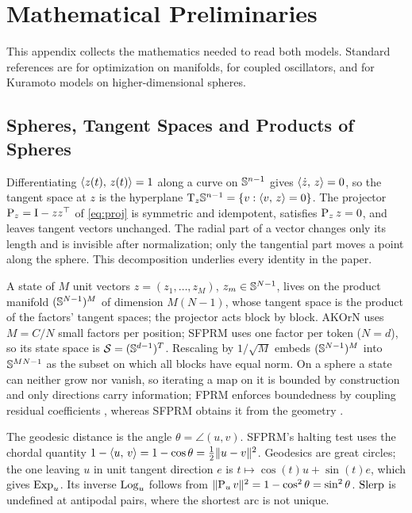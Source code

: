 
\section{Mathematical Preliminaries}
\label{app:prelim}

This appendix collects the mathematics needed to read both models. Standard references are
\citet{absil2008} for optimization on manifolds, \citet{kuramoto1984,strogatz2000} for coupled
oscillators, and \citet{lohe2009} for Kuramoto models on higher-dimensional spheres.

\subsection{Spheres, Tangent Spaces and Products of Spheres}

Differentiating $\langle z(t),\, z(t)\rangle=1$ along a curve on $\mathbb{S}^{n-1}$ gives $\langle \dot z,\, z\rangle=0$, so the
tangent space at $z$ is the hyperplane $\mathrm{T}_z\mathbb{S}^{n-1}=\{v:\langle v,\, z\rangle=0\}$. The projector
$\operatorname{P}_z=\mathrm{I}-zz^\top$ of \eqref{eq:proj} is symmetric and idempotent, satisfies $\operatorname{P}_zz=0$, and leaves
tangent vectors unchanged. The radial part of a vector changes only its length and is invisible after
normalization; only the tangential part moves a point along the sphere. This decomposition underlies
every identity in the paper.

A state of $M$ unit vectors $z=(z_1,\dots,z_M)$, $z_m\in\mathbb{S}^{N-1}$, lives on the product manifold
$(\mathbb{S}^{N-1})^M$ of dimension $M(N-1)$, whose tangent space is the product of the factors' tangent
spaces; the projector acts block by block. AKOrN uses $M=C/N$ small factors per position; SFPRM uses one
factor per token ($N=d$), so its state space is $\mathcal S=(\mathbb{S}^{d-1})^T$. Rescaling by $1/\sqrt M$
embeds $(\mathbb{S}^{N-1})^M$ into $\mathbb{S}^{MN-1}$ as the subset on which all blocks have equal norm. On a
sphere a state can neither grow nor vanish, so iterating a map on it is bounded by construction and
only directions carry information; FPRM enforces boundedness by coupling residual coefficients
\citep{movahedi2026fprm}, whereas SFPRM obtains it from the geometry \citep{sfprm}.

The geodesic distance is the angle $\theta=\angle(u,v)$. SFPRM's halting test uses the chordal
quantity $1-\langle u,\, v\rangle=1-\cos\theta=\tfrac12\lVert u-v\rVert^2$. Geodesics are great circles; the one leaving
$u$ in unit tangent direction $e$ is $t\mapsto\cos(t)u+\sin(t)e$, which gives $\operatorname{Exp}_u$. Its inverse
$\operatorname{Log}_u$ follows from $\lVert \operatorname{P}_uv\rVert^2=1-\cos^2\theta=\sin^2\theta$. $\operatorname{Slerp}$ is undefined at
antipodal pairs, where the shortest arc is not unique.

